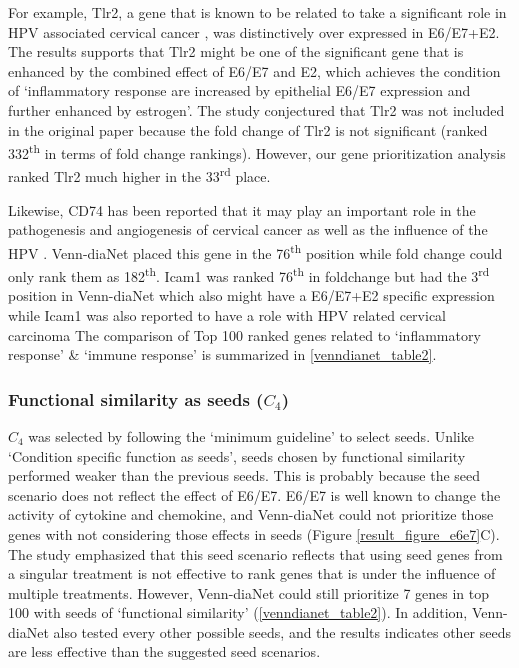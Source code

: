 \documentclass[oneside,phd]{snuthesis}
\begin{document}
For example, Tlr2, a gene that is known to be related to take a significant
role in HPV associated cervical cancer \citep{woodby2016interaction, zom2016tlr2, halec2018toll, yang2018relationship}, was distinctively over expressed in E6/E7+E2. The results supports that Tlr2 might be one of the significant gene that is enhanced by the combined effect of E6/E7 and E2, which achieves the condition of `inflammatory response are increased by epithelial E6/E7 expression and further enhanced by estrogen'.
The study conjectured that Tlr2 was not included in the original paper because the fold change of Tlr2 is not significant (ranked 332\textsuperscript{th} in terms of fold change rankings). 
However, our gene prioritization analysis ranked Tlr2 much higher in the 33\textsuperscript{rd} place.

Likewise, CD74 has been reported that it may play an important role in the pathogenesis and angiogenesis of cervical cancer \citep{cheng2011expression} as well as the influence of the HPV \citep{klymenko2017rnaseq}. Venn-diaNet placed this gene in the 76\textsuperscript{th} position while fold change could only rank them as 182\textsuperscript{th}.
Icam1 was ranked 76\textsuperscript{th} in foldchange but had the 3\textsuperscript{rd} position in Venn-diaNet which also might have a E6/E7+E2 specific expression while Icam1 was also  reported to have a role with HPV related cervical carcinoma \citep{viac1992epidermotropism}
The comparison of Top 100 ranked genes related to `inflammatory response' \& `immune response' is summarized in \ref{venndianet_table2}.


\subsubsection{Functional similarity as seeds ($C_4$)} 

$C_4$ was selected by following the `minimum guideline' to select seeds.
Unlike `Condition specific function as seeds', seeds chosen by functional similarity performed weaker than the previous seeds. 
This is probably because the seed scenario does not reflect the effect of E6/E7.
E6/E7 is well known to change the activity of cytokine and chemokine, and Venn-diaNet could not prioritize those genes with not considering those effects in seeds (Figure \ref{result_figure_e6e7}C). 
The study emphasized that this seed scenario reflects that using seed genes from a singular treatment is not effective to rank genes that is under the influence of multiple treatments.
However, Venn-diaNet could still prioritize 7 genes in top 100 with seeds of `functional similarity' (\ref{venndianet_table2}).
In addition, Venn-diaNet also tested every other possible seeds, and the results indicates other seeds are less effective than the suggested seed scenarios.
\end{document}

